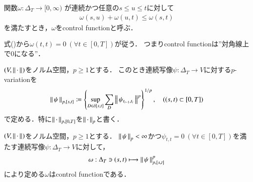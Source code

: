 	\begin{screen}
		\begin{dfn}
			関数$\omega:\Delta_T \longrightarrow [0,\infty)$
			が連続かつ任意の$s \leq u \leq t$に対して
			\begin{align}
				\omega(s,u) + \omega(u,t) \leq \omega(s,t)
				\label{eq:control_function_subadditivity}
			\end{align}
			を満たすとき，$\omega$をcontrol functionと呼ぶ．
		\end{dfn}
	\end{screen}
	
	式()から$\omega(t,t)=0\ (\forall t \in [0,T])$が従う．
	つまりcontrol functionは''対角線上で0になる''．
	
	\begin{screen}
		\begin{dfn}
			$(V,\left\|\, \cdot\, \right\|_{})$をノルム空間，$p \geq 1$とする．
			このとき連続写像$\psi:\Delta_T \longrightarrow V$に対する$p$-variationを
			\begin{align}
				\left\|\, \psi\, \right\|_{p,[s,t]}
				\coloneqq \left\{ \operatorname*{sup}_{D \in \delta[s,t]}  \sum_D \left\|\, \psi_{t_{i-1},t_i}\, \right\|_{}^p \right\}^{1/p},
				\quad ((s,t) \subset [0,T])
			\end{align}
			で定める．特に$\left\|\, \cdot\, \right\|_{p,[0,T]}$を$\left\|\, \cdot\, \right\|_{p}$と書く．
		\end{dfn}
	\end{screen}
	
	\begin{screen}
		\begin{thm}
			$(V,\left\|\, \cdot\, \right\|_{})$をノルム空間，$p \geq 1$とする．
			$\left\|\, \psi\, \right\|_{p} < \infty$かつ$\psi_{t,t} = 0\ (\forall t \in [0,T])$を満たす連続写像$\psi:\Delta_T \longrightarrow V$に対して，
			\begin{align}
				\omega:\Delta_T \ni (s,t) \longmapsto \left\|\, \psi\, \right\|_{p,[s,t]}^p
			\end{align}
			により定める$\omega$はcontrol functionである．
		\end{thm}
	\end{screen}
	
